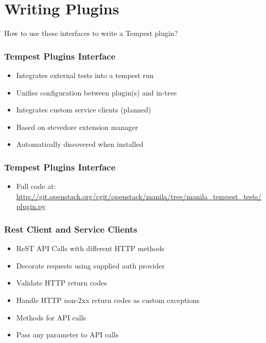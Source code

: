 \documentclass[aspectratio=169,11pt,hyperref={colorlinks=true}]{beamer}
\begin{document}
\section{Writing Plugins}
\begin{frame}[c]
    \begin{center}
        \large How to use these interfaces to write a Tempest plugin?
    \end{center}
\end{frame}

\begin{frame}
    \frametitle{Tempest Plugins Interface}
    \begin{itemize}
        \item Integrates external tests into a tempest run
        \item Unifies configuration between plugin(s) and in-tree
        \item Integrates custom service clients (planned)
    \end{itemize}
    \begin{itemize}
    	\item{Based on stevedore extension manager}
    	\item{Automatically discovered when installed}
    \end{itemize}
\end{frame}

\begin{frame}
    \frametitle{Tempest Plugins Interface}
    
    \begin{itemize}
        \item \tiny Full code at: \href{http://git.openstack.org/cgit/openstack/manila/tree/manila_tempest_tests/plugin.py}{http://git.openstack.org/cgit/openstack/manila/tree/manila\_tempest\_tests/plugin.py}
    \end{itemize}
\end{frame}

\begin{frame}
    \frametitle{Rest Client and Service Clients}
    \begin{itemize}
        \item ReST API Calls with different HTTP methods
        \item Decorate requests using supplied auth provider
        \item Validate HTTP return codes
        \item Handle HTTP non-2xx return codes as custom exceptions
    \end{itemize}
    \begin{itemize}
        \item Methods for API calls
        \item Pass any parameter to API calls
    \end{itemize}
\end{frame}
\end{document}
